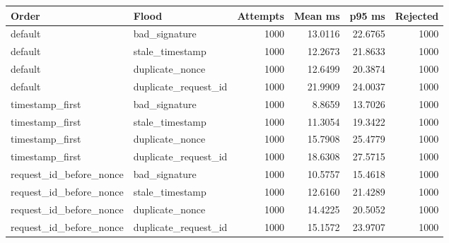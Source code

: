 \begin{tabular}{llrrrr}
\toprule
Order & Flood & Attempts & Mean ms & p95 ms & Rejected \\
\midrule
default & bad_signature & 1000 & 13.0116 & 22.6765 & 1000 \\
default & stale_timestamp & 1000 & 12.2673 & 21.8633 & 1000 \\
default & duplicate_nonce & 1000 & 12.6499 & 20.3874 & 1000 \\
default & duplicate_request_id & 1000 & 21.9909 & 24.0037 & 1000 \\
timestamp_first & bad_signature & 1000 & 8.8659 & 13.7026 & 1000 \\
timestamp_first & stale_timestamp & 1000 & 11.3054 & 19.3422 & 1000 \\
timestamp_first & duplicate_nonce & 1000 & 15.7908 & 25.4779 & 1000 \\
timestamp_first & duplicate_request_id & 1000 & 18.6308 & 27.5715 & 1000 \\
request_id_before_nonce & bad_signature & 1000 & 10.5757 & 15.4618 & 1000 \\
request_id_before_nonce & stale_timestamp & 1000 & 12.6160 & 21.4289 & 1000 \\
request_id_before_nonce & duplicate_nonce & 1000 & 14.4225 & 20.5052 & 1000 \\
request_id_before_nonce & duplicate_request_id & 1000 & 15.1572 & 23.9707 & 1000 \\
\bottomrule
\end{tabular}
